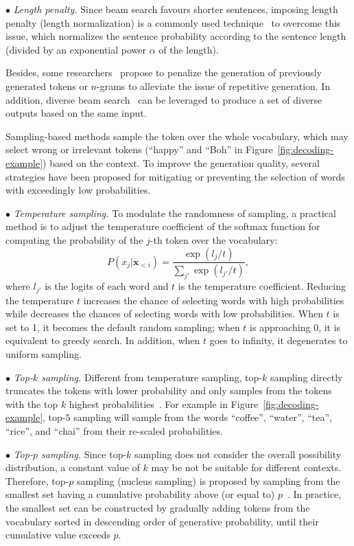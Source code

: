 $\bullet$ \emph{Length penalty.} 
Since beam search favours shorter sentences, imposing length penalty (\aka length normalization) is a commonly used technique~\cite{Wu-arxiv-2016-Google} to overcome this issue, which normalizes the sentence probability according to the sentence length (divided by an exponential power $\alpha$ of the length).

Besides, some researchers~\cite{Paulus-iclr-2018-A} propose to penalize the generation of previously  generated tokens or $n$-grams to alleviate the issue of repetitive generation. In addition, diverse beam search~\cite{Vijayakumar-arxiv-2016-Diverse} can be leveraged to produce a set of diverse outputs based on the same input.

Sampling-based methods sample the token over the whole vocabulary, which may select wrong or irrelevant tokens (\eg ``happy'' and ``Boh'' in Figure~\ref{fig:decoding-example}) based on the context. To improve the generation quality, several strategies have been proposed for mitigating or preventing  the selection of words with exceedingly low probabilities.

$\bullet$ \emph{Temperature sampling.}
To modulate the randomness of sampling, a practical method is to adjust the temperature coefficient of the softmax function for computing the probability of the $j$-th token over the vocabulary:
\begin{equation}
    P(x_j|\mathbf{x}_{<i}) = \frac{\exp{(l_j/t)}}{\sum_{j'} \exp{(l_{j'}/t)}},
\end{equation}
where $l_{j'}$ is the logits of each word and $t$ is the temperature coefficient.  Reducing the temperature $t$ increases the chance of selecting words with high probabilities while decreases the chances of selecting words with low probabilities. 
When $t$ is set to 1, it becomes the default random sampling; when $t$ is approaching 0, it is equivalent to greedy search. 
In addition, when $t$ goes to infinity, it degenerates to uniform sampling. 

$\bullet$ \emph{Top-$k$ sampling.} 
Different from temperature sampling, top-$k$ sampling directly truncates the tokens with lower probability and only samples from the tokens with the top $k$ highest probabilities~\cite{Fan-2018-ACL-Hierarchical}. For example in Figure~\ref{fig:decoding-example}, top-$5$ sampling will sample from the words ``coffee'', ``water'', ``tea'', ``rice'', and ``chai'' from their re-scaled probabilities.

$\bullet$ \emph{Top-$p$ sampling.} 
Since top-$k$ sampling does not consider the overall  possibility distribution, a constant value of  $k$  may be not be suitable for different contexts. Therefore, top-$p$ sampling (\aka nucleus sampling) is proposed by sampling from the smallest set having a cumulative probability above (or equal to) $p$~\cite{Holtzman-2020-ICLR-The}. In practice, the smallest set can be constructed by gradually adding tokens from the vocabulary sorted in descending order of generative probability, until their cumulative value exceeds $p$.

